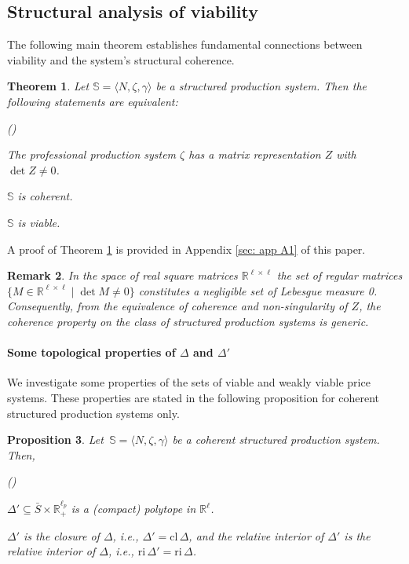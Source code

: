 \documentclass[11pt,fleqn]{article}
\newcounter{llst}
\newenvironment{abet}{\begin{list}{\rm (\alph{llst})}{\usecounter{llst}
		\setlength{\itemindent}{0em} \setlength{\leftmargin}{3em}
		\setlength{\labelwidth}{2em} \setlength{\labelsep}{1em}}}{\end{list}}
\newcounter{llist}
\newenvironment{numm}{\begin{list}{\rm (\roman{llist})}{\usecounter{llist}
	\setlength{\itemindent}{0em} \setlength{\leftmargin}{3.5em}
	\setlength{\labelwidth}{2.5em} \setlength{\labelsep}{1em}}}{\end{list}}
\newtheorem{theorem}{Theorem}[section]
\newtheorem{proposition}[theorem]{Proposition}
\newtheorem{remark}[theorem]{Remark}
\begin{document}
\subsection{Structural analysis of viability}\label{sec: Structural analysis of viability}
The following main theorem establishes fundamental connections between viability and the system's structural coherence.

\begin{theorem} \label{thm:ViabilityStructural}
	Let $\mathbb S = \langle N, \zeta , \gamma \rangle$ be a structured production system. Then the following statements are equivalent:
	\begin{numm}
		\item The professional production system $\zeta$ has a matrix representation $Z$ with $\det Z \neq 0$.
		\item $\mathbb S$ is coherent.
		\item $\mathbb S$ is viable.
	\end{numm}
\end{theorem}

\noindent
A proof of Theorem \ref{thm:ViabilityStructural} is provided in Appendix \ref{sec: app A1} of this paper.

\begin{remark} \label{rem:Genericity}
	In the space of real square matrices $\mathbb R^{\ell \times \ell}$ the set of regular matrices $\{ M \in \mathbb R^{\ell \times \ell} \mid \det M \neq 0 \}$ constitutes a negligible set of Lebesgue measure 0. Consequently, from the equivalence of coherence and non-singularity of $Z$, the coherence property on the class of structured production systems is generic. 
\end{remark}


\paragraph{Some topological properties of $\Delta$ and $\Delta'$}

We investigate some properties of the sets of viable and weakly viable price systems. These properties are stated in the following proposition for coherent structured production systems only.

\begin{proposition} \label{prop:DeltaProps}
	Let $\, \mathbb S = \langle N, \zeta , \gamma \rangle$ be a coherent structured production system. Then, 
	\begin{abet}
		\item $\Delta' \subseteq  \bar S \times \mathbb R^{\ell_p}_+$ is a (compact) polytope in $\mathbb R^{\ell}$. 
		\item  $\Delta'$ is the closure of $\Delta$, i.e., $\Delta' = \mathrm{cl} \, \Delta$, and the relative interior of $\Delta'$ is the relative interior of $\Delta$, i.e., $\mathrm{ri} \, \Delta' = \mathrm{ri} \, \Delta$. 
	\end{abet}
\end{proposition}
\end{document}

